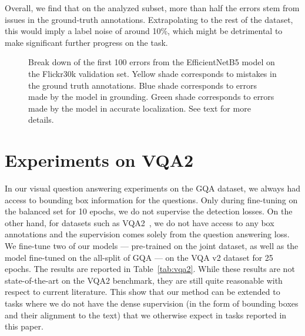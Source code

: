 Overall, we find that on the analyzed subset, more than half the errors stem from issues in the ground-truth annotations. Extrapolating to the rest of the dataset, this would imply a label noise of around 10\%, which might be detrimental to make significant further progress on the task.


\begin{figure}[t] \centering
{}
\caption{Break down of the first 100 errors from the EfficientNetB5 model on the Flickr30k validation set. Yellow shade corresponds to mistakes in the ground truth annotations. Blue shade corresponds to errors made by the model in grounding. Green shade corresponds to errors made by the model in accurate localization. See text for more details.}
\label{fig:errors}
\end{figure}


\section{Experiments on VQA2}
\label{sec:vqa2}
In our visual question answering experiments on the GQA dataset, we always had access to bounding box information for the questions. Only during fine-tuning on the balanced set for 10 epochs, we do not supervise the detection losses. On the other hand, for datasets such as VQA2~\cite{balanced_vqa_v2}, we do not have access to any box annotations and the supervision comes solely from the question answering loss. We fine-tune two of our models --- pre-trained on the joint dataset, as well as the model fine-tuned on the all-split of GQA --- on the VQA v2 dataset for 25 epochs. The results are reported in Table~\ref{tab:vqa2}.  
While these results are not state-of-the-art on the VQA2 benchmark, they are still quite reasonable with respect to current literature. This show that our method can be extended to tasks where we do not have the dense supervision (in the form of bounding boxes and their alignment to the text) that we otherwise expect in tasks reported in this paper.  

